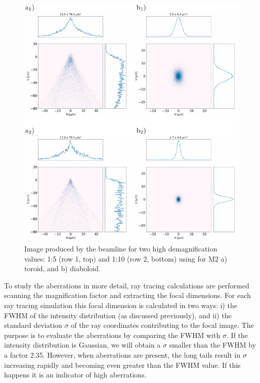 \documentclass{iucr}              %
\begin{document}
\begin{figure}\label{fig:demagnification}
\includegraphics[width=1.0\textwidth]{figures/fig5.pdf}
% 
% 
\caption{
Image produced by the beamline for two high demagnification values: 1:5 (row 1, top) and 1:10 (row 2, bottom) using for M2 a) toroid, and b) diaboloid.}
\end{figure}


To study the aberrations in more detail, ray tracing calculations are performed scanning the magnification factor and extracting the focal dimensions. For each ray tracing simulation this focal dimension is calculated in two ways: i) the FWHM of the intensity distribution (as discussed previously), and ii) the standard deviation $\sigma$ of the ray coordinates contributing to the focal image. The purpose is to evaluate the aberrations by comparing the FWHM with $\sigma$. If the intensity distribution is Gaussian, we will obtain a $\sigma$ smaller than the FWHM by a factor 2.35. However, when aberrations are present, the long tails result in $\sigma$ increasing rapidly and becoming even greater than the FWHM value. If this happens it is an indicator of high aberrations.  
\end{document}
